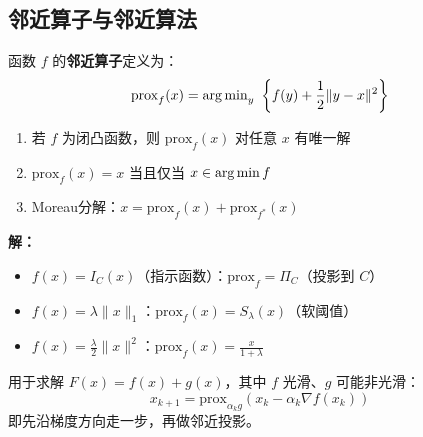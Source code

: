 \subsection{邻近算子与邻近算法}

\begin{definition}
函数 $f$ 的\textbf{邻近算子}定义为：
\[
\text{prox}_f(x) = \operatorname{arg\,min}_y\ \left\{f(y) + \frac{1}{2}\|y - x\|^2\right\}
\]
\end{definition}

\begin{property}[邻近算子性质]
\begin{enumerate}[label=(\arabic*)]
    \item 若 $f$ 为闭凸函数，则 $\text{prox}_f(x)$ 对任意 $x$ 有唯一解
    \item $\text{prox}_f(x) = x$ 当且仅当 $x \in \operatorname{arg\,min} f$
    \item Moreau分解：$x = \text{prox}_f(x) + \text{prox}_{f^*}(x)$
\end{enumerate}
\end{property}

\begin{example}[常见邻近算子]
\textbf{解：}

\begin{itemize}[itemsep=0.3em]
    \item $f(x) = I_C(x)$（指示函数）：$\text{prox}_f = \Pi_C$（投影到 $C$）
    \item $f(x) = \lambda\|x\|_1$：$\text{prox}_f(x) = S_\lambda(x)$（软阈值）
    \item $f(x) = \frac{\lambda}{2}\|x\|^2$：$\text{prox}_f(x) = \frac{x}{1+\lambda}$
\end{itemize}
\end{example}

\begin{algobox}
用于求解 $F(x) = f(x) + g(x)$，其中 $f$ 光滑、$g$ 可能非光滑：
\[
x_{k+1} = \text{prox}_{\alpha_k g}\left(x_k - \alpha_k \nabla f(x_k)\right)
\]
即先沿梯度方向走一步，再做邻近投影。
\end{algobox}

